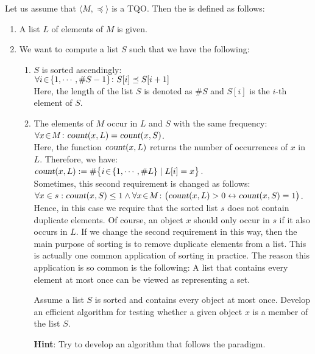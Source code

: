 Let us assume that $\langle M, \preceq \rangle$ is a  \textsc{TQO}.  Then the 
is defined as follows:
\begin{enumerate}
\item A list $L$ of elements of $M$ is given.
\item We want to compute a list $S$ such that we have the following: 
  \begin{enumerate}
  \item $S$ is sorted ascendingly: \\[0.2cm]
        \hspace*{1.3cm} 
        $\forall i \!\in\! \{ 1, \cdots, \#S-1 \} \colon S[i] \preceq S[i+1]$ 
        \\[0.2cm]
        Here, the length of the list $S$ is denoted as $\#S$ and $S[i]$ is the $i$-th element of $S$.
  \item The elements of $M$ occur in $L$ and $S$ with the same frequency: \\[0.2cm]
        \hspace*{1.3cm} 
        $\forall x\!\in\! M \colon \textsl{count}(x,L) = \textsl{count}(x,S)$.
        \\[0.2cm]
        Here, the function $\textsl{count}(x,L)$ returns the number of occurrences of $x$ in $L$.
        Therefore, we have: \\[0.2cm]
        \hspace*{1.3cm}
        $\textsl{count}(x,L) := \# \bigl\{ i \!\in\! \{1,\cdots,\#L\} \mid L[i] = x \bigr\}$.
        \\[0.2cm]
        Sometimes, this second requirement is changed as follows:
        \\[0.2cm]
        \hspace*{1.3cm}
        $\forall x \in s: \textsl{count}(x,S) \leq 1 \wedge \forall x\!\in\! M \colon \bigl(\textsl{count}(x,L) > 0 \leftrightarrow \textsl{count}(x,S) = 1\bigr)$.
        \\[0.2cm]
        Hence, in this case we require that the sorted list $s$ does not contain duplicate elements.
        Of course, an object $x$ should only occur in $s$ if it also occurs in $L$.  If we change
        the second requirement in this way, then the main purpose of sorting is to remove duplicate
        elements from a list.  This is actually one common application of sorting in practice.  The
        reason this application is so common is the following: A list that contains every element at
        most once can be viewed as representing a set.

        \exercise
        Assume a list $S$ is sorted and contains every object at most once.  Develop an efficient
        algorithm for testing whether a given object $x$ is a member of the list $S$.

        \textbf{Hint}: Try to develop an algorithm that follows the 
        paradigm. 
  \end{enumerate}
\end{enumerate}
